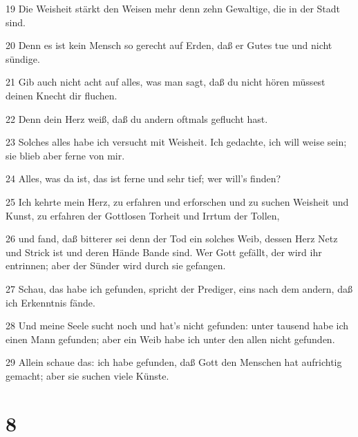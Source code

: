 \par 19 Die Weisheit stärkt den Weisen mehr denn zehn Gewaltige, die in der Stadt sind.
\par 20 Denn es ist kein Mensch so gerecht auf Erden, daß er Gutes tue und nicht sündige.
\par 21 Gib auch nicht acht auf alles, was man sagt, daß du nicht hören müssest deinen Knecht dir fluchen.
\par 22 Denn dein Herz weiß, daß du andern oftmals geflucht hast.
\par 23 Solches alles habe ich versucht mit Weisheit. Ich gedachte, ich will weise sein; sie blieb aber ferne von mir.
\par 24 Alles, was da ist, das ist ferne und sehr tief; wer will's finden?
\par 25 Ich kehrte mein Herz, zu erfahren und erforschen und zu suchen Weisheit und Kunst, zu erfahren der Gottlosen Torheit und Irrtum der Tollen,
\par 26 und fand, daß bitterer sei denn der Tod ein solches Weib, dessen Herz Netz und Strick ist und deren Hände Bande sind. Wer Gott gefällt, der wird ihr entrinnen; aber der Sünder wird durch sie gefangen.
\par 27 Schau, das habe ich gefunden, spricht der Prediger, eins nach dem andern, daß ich Erkenntnis fände.
\par 28 Und meine Seele sucht noch und hat's nicht gefunden: unter tausend habe ich einen Mann gefunden; aber ein Weib habe ich unter den allen nicht gefunden.
\par 29 Allein schaue das: ich habe gefunden, daß Gott den Menschen hat aufrichtig gemacht; aber sie suchen viele Künste.

\chapter{8}

